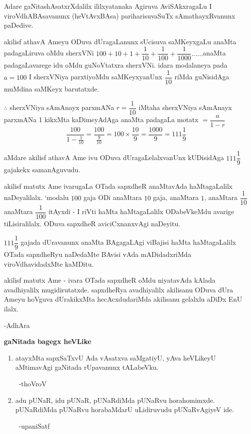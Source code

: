 Adare gaNitashAsatxrXdalilx ililxyatanaka Agiruva AviSAkxragaLu I viroVdhABAsa\-vanunx (heVtAvxBAsa) pariharisuvaSuTx sAmathayxRvanunx paDedive.
\vskip 3pt

akilisf athavA Ameyu ODuva dUragaLanunx sUcisuva saMKeyxgaLu anaMta padagaLiruva oMdu sherxVNi $100+10+1+\dfrac{1}{10}+\dfrac{1}{100}+\dfrac{1}{1000}\ldots\ldots$anaMta padagaLavarege idu oMdu guNoVtatxra sherxVNi. idara modalaneya pada $a=100$ I sherxVNiya parxtiyoMdu saMKeyxyanUnx $\dfrac{1}{10}$ riMda guNisidAga muMdina saMKeyx barutatxde.
\vskip 3pt

$\therefore$ sherxVNiya sAmAnayx parxmANa $r=\dfrac{1}{10}$ iMtaha sherxVNiya sAmAnayx parxmANa {\rm 1} kikxMta kaDimeyAdAga anaMta padagaLa motatx $=\dfrac{a}{1-r}$
$$
\frac{100}{1-\frac{1}{10}}=\frac{100}{\frac{9}{10}}=100\times \frac{10}{9}=\frac{1000}{9}=111\frac{1}{9}
$$
\newpage

aMdare akilisf athavA Ame ivu ODuva dUragaLelalxvanUnx kUDisidAga $111\dfrac{1}{9}$ gajakekx samanAguvudu.

akilisf matutx Ame ivarugaLa OTada sapxdheR anaMtavAda haMtagaLalilx naDeyalilalx. `modalu $100$ gaja ODi anaMtara $10$ gaja, anaMtara $1$, anaMtara $\dfrac{1}{10}$ anaMtara $\dfrac{1}{100}$ itAyxdi - I riVti haMta haMtagaLalilx ODabeVkeMdu avarige tiLisiralilalx. ODuva sapxdheR aviciCxnanxvAgi naDeyitu.

$111\dfrac{1}{9}$ gajada dUravanunx anaMta BAgagaLAgi viBajisi haMta haMtagaLalilx OTada sapxdheRyu naDedaMte BAvisi vAda mADidadxriMda viroVdhavidadxMte kaMDitu. 

akilisf matutx Ame - ivara OTada sapxdheR oMdu niyatavAda kAlada avadhiyalilx mugidirutatxde. sapxdheRya avadhiyalilx akilisanu ODuva dUra Ameyu hoVguva dUrakikxMta hecAcxdudariMda akilisanu gelalxlu aDiDx EnU ilalx.

\hfill{-AdhAra}

\begin{center}
{\bf gaNitada bagegx heVLike} 
\end{center}
\begin{enumerate}[\rm 1)]
\item atayxMta sapxSaTxvU Ada vAsatxva saMgatiyU, yAva heVLikeyU aMtimavAgi gaNitada rUpavanunx tALabeVku.

~\hfill -thoVroV

\item adu pUNaR, idu pUNaR, pUNaRdiMda pUNaRvu horahomimxde. pUNaRdiMda pUNaRvu horabaMdarU uLidiruvudu pUNaRvAgiyeV ide.

~\hfill -upaniSatf
\end{enumerate}

